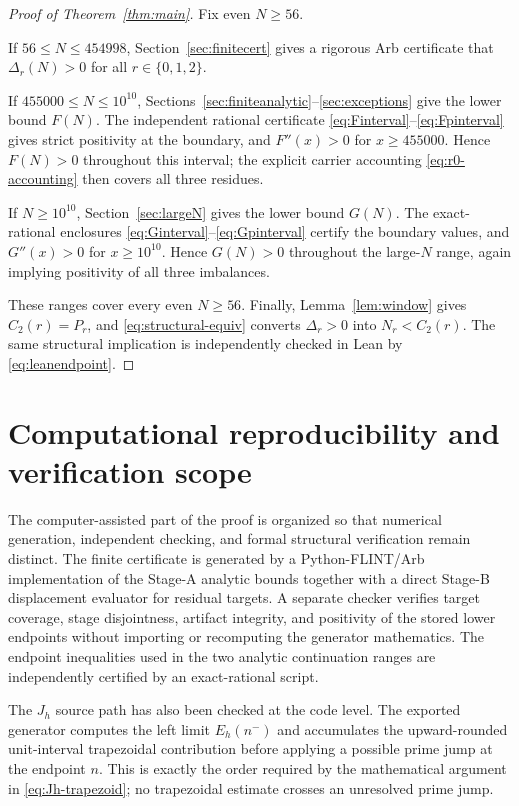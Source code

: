 \documentclass[11pt]{article}
\theoremstyle{definition}
\begin{document}
\begin{proof}[Proof of Theorem~\ref{thm:main}]
Fix even $N\ge56$.

If $56\le N\le454998$, Section~\ref{sec:finitecert} gives a rigorous Arb certificate that $\Delta_r(N)>0$ for all $r\in\{0,1,2\}$.

If $455000\le N\le10^{10}$, Sections~\ref{sec:finiteanalytic}--\ref{sec:exceptions} give the lower bound $F(N)$. The independent rational certificate \eqref{eq:Finterval}--\eqref{eq:Fpinterval} gives strict positivity at the boundary, and $F''(x)>0$ for $x\ge455000$. Hence $F(N)>0$ throughout this interval; the explicit carrier accounting \eqref{eq:r0-accounting} then covers all three residues.

If $N\ge10^{10}$, Section~\ref{sec:largeN} gives the lower bound $G(N)$. The exact-rational enclosures \eqref{eq:Ginterval}--\eqref{eq:Gpinterval} certify the boundary values, and $G''(x)>0$ for $x\ge10^{10}$. Hence $G(N)>0$ throughout the large-$N$ range, again implying positivity of all three imbalances.

These ranges cover every even $N\ge56$. Finally, Lemma~\ref{lem:window} gives $C_2(r)=P_r$, and \eqref{eq:structural-equiv} converts $\Delta_r>0$ into $N_r<C_2(r)$. The same structural implication is independently checked in Lean by \eqref{eq:leanendpoint}.
\end{proof}

\section{Computational reproducibility and verification scope}\label{sec:repro}

The computer-assisted part of the proof is organized so that numerical generation, independent checking, and formal structural verification remain distinct. The finite certificate is generated by a Python-FLINT/Arb implementation of the Stage-A analytic bounds together with a direct Stage-B displacement evaluator for residual targets. A separate checker verifies target coverage, stage disjointness, artifact integrity, and positivity of the stored lower endpoints without importing or recomputing the generator mathematics. The endpoint inequalities used in the two analytic continuation ranges are independently certified by an exact-rational script.

The $J_h$ source path has also been checked at the code level. The exported generator computes the left limit $E_h(n^-)$ and accumulates the upward-rounded unit-interval trapezoidal contribution before applying a possible prime jump at the endpoint $n$. This is exactly the order required by the mathematical argument in \eqref{eq:Jh-trapezoid}; no trapezoidal estimate crosses an unresolved prime jump.
\end{document}

